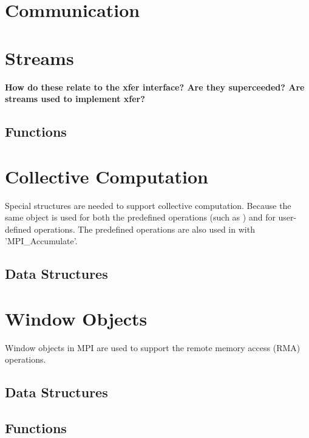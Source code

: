 \documentclass{article}
\begin{document}
\section{Communication}



\section{Streams}
\textbf{How do these relate to the xfer interface?  Are they
superceeded?  Are streams used to implement xfer?}

%
\subsection{Functions}


\section{Collective Computation}
Special structures are needed to support collective computation.
Because the same object is used for both the predefined operations
(such as ) and for user-defined operations.  The
predefined operations are also used in with 'MPI_Accumulate'.

%
\subsection{Data Structures}

%

\section{Window Objects}
\label{sec:window-objects}
Window objects in MPI are used to support the remote memory access
(RMA) operations.  
\subsection{Data Structures}

\subsection{Functions}

\end{document}
